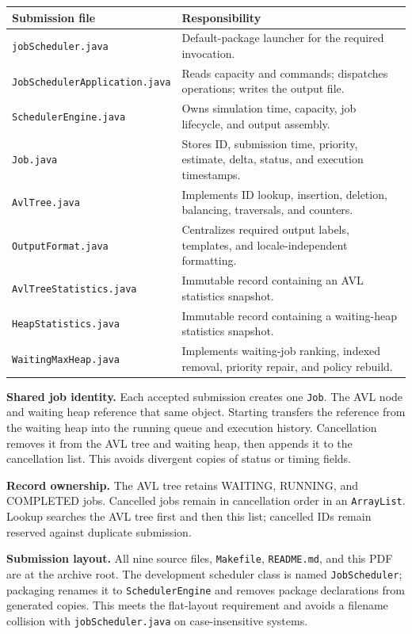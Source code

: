 \documentclass[10pt,letterpaper]{article}
\newcommand{\code}[1]{\texttt{#1}}
\begin{document}
\begin{tabularx}{\linewidth}{@{}lY@{}}\toprule
\textbf{Submission file} & \textbf{Responsibility}\\\midrule
\code{jobScheduler.java} & Default-package launcher for the required invocation.\\
\code{JobSchedulerApplication.java} & Reads capacity and commands; dispatches operations; writes the output file.\\
\code{SchedulerEngine.java} & Owns simulation time, capacity, job lifecycle, and output assembly.\\
\code{Job.java} & Stores ID, submission time, priority, estimate, delta, status, and execution timestamps.\\
\code{AvlTree.java} & Implements ID lookup, insertion, deletion, balancing, traversals, and counters.\\
\code{OutputFormat.java} & Centralizes required output labels, templates, and locale-independent formatting.\\
\code{AvlTreeStatistics.java} & Immutable record containing an AVL statistics snapshot.\\
\code{HeapStatistics.java} & Immutable record containing a waiting-heap statistics snapshot.\\
\code{WaitingMaxHeap.java} & Implements waiting-job ranking, indexed removal, priority repair, and policy rebuild.\\\bottomrule
\end{tabularx}

\textbf{Shared job identity.} Each accepted submission creates one \code{Job}. The AVL node and waiting heap reference that same object. Starting transfers the reference from the waiting heap into the running queue and execution history. Cancellation removes it from the AVL tree and waiting heap, then appends it to the cancellation list. This avoids divergent copies of status or timing fields.

\textbf{Record ownership.} The AVL tree retains WAITING, RUNNING, and COMPLETED jobs. Cancelled jobs remain in cancellation order in an \code{ArrayList}. Lookup searches the AVL tree first and then this list; cancelled IDs remain reserved against duplicate submission.

\textbf{Submission layout.} All nine source files, \code{Makefile}, \code{README.md}, and this PDF are at the archive root. The development scheduler class is named \code{JobScheduler}; packaging renames it to \code{SchedulerEngine} and removes package declarations from generated copies. This meets the flat-layout requirement and avoids a filename collision with \code{jobScheduler.java} on case-insensitive systems.
\end{document}

